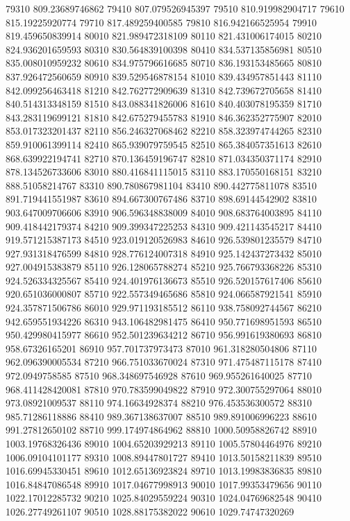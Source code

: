 {79310 809.23689746862
79410 807.079526945397
79510 810.919982904717
79610 815.19225920774
79710 817.489259400585
79810 816.942166525954
79910 819.459650839914
80010 821.989472318109
80110 821.431006174015
80210 824.936201659593
80310 830.564839100398
80410 834.537135856981
80510 835.008010959232
80610 834.975796616685
80710 836.193153485665
80810 837.926472560659
80910 839.529546878154
81010 839.434957851443
81110 842.099256463418
81210 842.762772909639
81310 842.739672705658
81410 840.514313348159
81510 843.088341826006
81610 840.403078195359
81710 843.283119699121
81810 842.675279455783
81910 846.362352775907
82010 853.017323201437
82110 856.246327068462
82210 858.323974744265
82310 859.910061399114
82410 865.939079759545
82510 865.384057351613
82610 868.639922194741
82710 870.136459196747
82810 871.034350371174
82910 878.134526733606
83010 880.416841115015
83110 883.170550168151
83210 888.51058214767
83310 890.780867981104
83410 890.442775811078
83510 891.719441551987
83610 894.667300767486
83710 898.69144542902
83810 903.647009706606
83910 906.596348838009
84010 908.683764003895
84110 909.418442179374
84210 909.399347225253
84310 909.421143545217
84410 919.571215387173
84510 923.019120526983
84610 926.539801235579
84710 927.931318476599
84810 928.776124007318
84910 925.142437273432
85010 927.004915383879
85110 926.128065788274
85210 925.766793368226
85310 924.526334325567
85410 924.401976136673
85510 926.520157617406
85610 920.651036000807
85710 922.557349465686
85810 924.066587921541
85910 924.357871506786
86010 929.971193185512
86110 938.758092744567
86210 942.659551934226
86310 943.106482981475
86410 950.771698951593
86510 950.429980415977
86610 952.501239634212
86710 956.991619380693
86810 958.67326165201
86910 957.701737973473
87010 961.318280504806
87110 962.096390005534
87210 966.751033670024
87310 971.475487115178
87410 972.0949758585
87510 968.348697546928
87610 969.955261640025
87710 968.411428420081
87810 970.783599049822
87910 972.300755297064
88010 973.08921009537
88110 974.16634928374
88210 976.453536300572
88310 985.71286118886
88410 989.367138637007
88510 989.891006996223
88610 991.27812650102
88710 999.174974864962
88810 1000.50958826742
88910 1003.19768326436
89010 1004.65203929213
89110 1005.57804464976
89210 1006.09104101177
89310 1008.89447801727
89410 1013.50158211839
89510 1016.69945330451
89610 1012.65136923824
89710 1013.19983836835
89810 1016.84847086548
89910 1017.04677998913
90010 1017.99353479656
90110 1022.17012285732
90210 1025.84029559224
90310 1024.04769682548
90410 1026.27749261107
90510 1028.88175382022
90610 1029.74747320269
}
